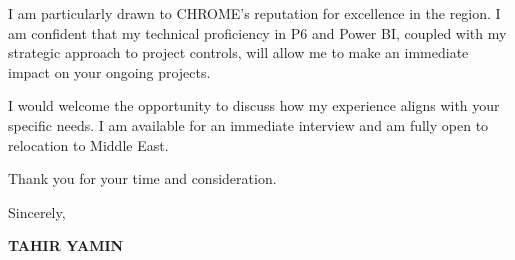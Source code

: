 \documentclass[11pt,a4paper]{article}
\begin{document}
I am particularly drawn to CHROME's reputation for excellence in the region. I am confident that my technical proficiency in P6 and Power BI, coupled with my strategic approach to project controls, will allow me to make an immediate impact on your ongoing projects.

I would welcome the opportunity to discuss how my experience aligns with your specific needs. I am available for an immediate interview and am fully open to relocation to Middle East.

Thank you for your time and consideration.

\vspace{0.5cm}
Sincerely,

\vspace{0.5cm}
\textbf{TAHIR YAMIN}
\end{document}
